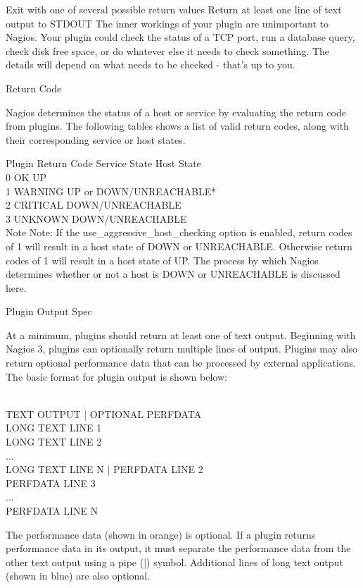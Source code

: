 \documentclass[11pt,final,oneside]{fithesis}
\begin{document}
Exit with one of several possible return values
Return at least one line of text output to STDOUT
The inner workings of your plugin are unimportant to Nagios. Your plugin could check the status of a TCP port, run a database query, check disk free space, or do whatever else it needs to check something. The details will depend on what needs to be checked - that's up to you.

Return Code

Nagios determines the status of a host or service by evaluating the return code from plugins. The following tables shows a list of valid return codes, along with their corresponding service or host states.

Plugin Return Code	Service State	Host State
\\0	OK	UP
\\1	WARNING	UP or DOWN/UNREACHABLE*
\\2	CRITICAL	DOWN/UNREACHABLE
\\3	UNKNOWN	DOWN/UNREACHABLE
\\Note Note: If the use\_aggressive\_host\_checking option is enabled, return codes of 1 will result in a host state of DOWN or UNREACHABLE. Otherwise return codes of 1 will result in a host state of UP. The process by which Nagios determines whether or not a host is DOWN or UNREACHABLE is discussed here.

Plugin Output Spec

At a minimum, plugins should return at least one of text output. Beginning with Nagios 3, plugins can optionally return multiple lines of output. Plugins may also return optional performance data that can be processed by external applications. The basic format for plugin output is shown below:

\\TEXT OUTPUT | OPTIONAL PERFDATA
\\LONG TEXT LINE 1
\\LONG TEXT LINE 2
\\...
\\LONG TEXT LINE N | PERFDATA LINE 2
\\PERFDATA LINE 3
\\...
\\PERFDATA LINE N

The performance data (shown in orange) is optional. If a plugin returns performance data in its output, it must separate the performance data from the other text output using a pipe (|) symbol. Additional lines of long text output (shown in blue) are also optional.
\cite{01}
\end{document}
